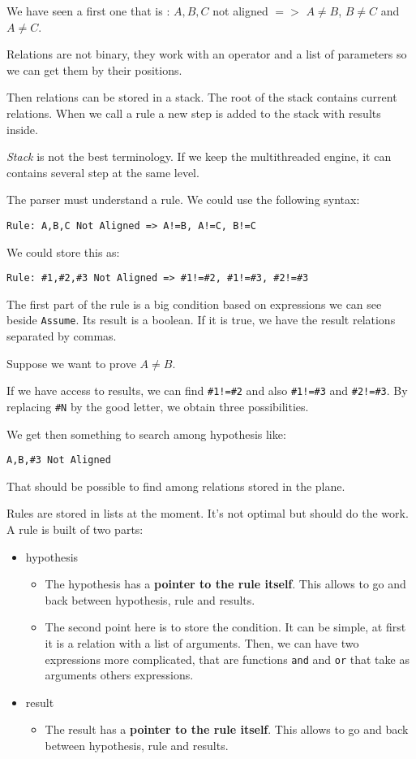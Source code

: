\documentclass[a4paper]{article}
\begin{document}
We have seen a first one that is : $A,B,C$ not aligned $=>$ $A\neq B$, $B\neq C$ and $A\neq C$.

Relations are not binary, they work with an operator and a list of parameters so we can get them by their positions.

Then relations can be stored in a stack. The root of the stack contains current relations. When we call a rule a new step is added to the stack with results inside.

\textit{Stack} is not the best terminology. If we keep the multithreaded engine, it can contains several step at the same level.

The parser must understand a rule. We could use the following syntax:

\begin{verbatim}
Rule: A,B,C Not Aligned => A!=B, A!=C, B!=C
\end{verbatim}

We could store this as:
\begin{verbatim}
Rule: #1,#2,#3 Not Aligned => #1!=#2, #1!=#3, #2!=#3
\end{verbatim}

The first part of the rule is a big condition based on expressions we can see beside \texttt{Assume}. Its result is a boolean. If it is true, we have the result relations separated by commas.

Suppose we want to prove $A\neq B$.

If we have access to results, we can find \texttt{\#1!=\#2} and also \texttt{\#1!=\#3} and \texttt{\#2!=\#3}. By replacing \texttt{\#N} by the good letter, we obtain three possibilities.

We get then something to search among hypothesis like:
\begin{verbatim}
A,B,#3 Not Aligned
\end{verbatim}

That should be possible to find among relations stored in the plane.

Rules are stored in lists at the moment. It's not optimal but should do the work.
A rule is built of two parts:
\begin{itemize}
\item hypothesis
\begin{itemize}
\item The hypothesis has a \textbf{pointer to the rule itself}. This allows to go and back between hypothesis, rule and results.
\item The second point here is to store the condition. It can be simple, at first it is a relation with a list of arguments. Then, we can have two expressions more complicated, that are functions \texttt{and} and \texttt{or} that take as arguments others expressions.
\end{itemize}
\item result
\begin{itemize}
\item The result has a \textbf{pointer to the rule itself}. This allows to go and back between hypothesis, rule and results.
\end{itemize}
\end{itemize}
\end{document}
